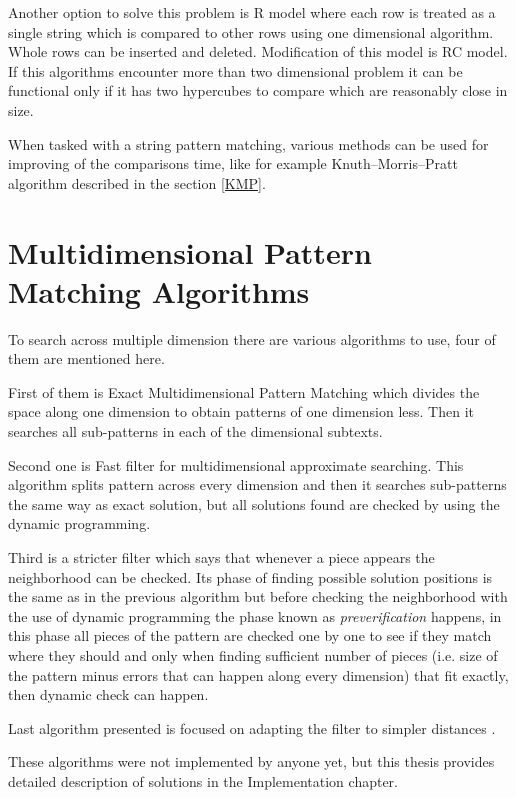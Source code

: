 Another option to solve this problem is R model where each row is treated as a single string which is compared to other rows using one dimensional algorithm. Whole rows can be inserted and deleted. Modification of this model is RC model. If this algorithms encounter more than two dimensional problem it can be functional only if it has two hypercubes to compare which are reasonably close in size.

When tasked with a string pattern matching, various methods can be used for improving of the comparisons time, like for example Knuth--Morris--Pratt algorithm described in the section \ref{KMP}.

\section{Multidimensional Pattern Matching Algorithms}
To search across multiple dimension there are various algorithms to use, four of them are mentioned here. 

First of them is Exact Multidimensional Pattern Matching which divides the space along one dimension to obtain patterns of one dimension less. Then it searches all sub-patterns in each of the dimensional subtexts.

Second one is Fast filter for multidimensional approximate searching. This algorithm splits pattern across every dimension and then it searches sub-patterns the same way as exact solution, but all solutions found are checked by using the dynamic programming. 

Third is a stricter filter which says that whenever a piece appears the neighborhood can be checked. Its phase of finding possible solution positions is the same as in the previous algorithm but before checking the neighborhood with the use of dynamic programming the phase known as \textit{preverification} happens, in this phase all pieces of the pattern are checked one by one to see if they match where they should and only when finding sufficient number of pieces (i.e. size of the pattern minus errors that can happen along every dimension) that fit exactly, then dynamic check can happen. 

Last algorithm presented is focused on adapting the filter to simpler distances \cite{mdApproxPM}.

These algorithms were not implemented by anyone yet, but this thesis provides detailed description of solutions in the Implementation chapter.

